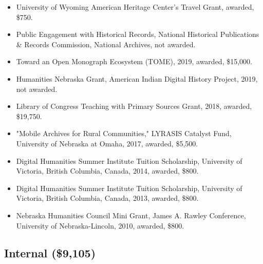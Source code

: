\documentclass[10pt]{article}
\begin{document}
\begin{itemize}
  \item University of Wyoming American Heritage Center's Travel Grant, awarded, \$750.
  \item Public Engagement with Historical Records, National Historical Publications \& Records Commission, National Archives, not awarded.
  \item Toward an Open Monograph Ecosystem (TOME), 2019, awarded, \$15,000.
  \item Humanities Nebraska Grant, American Indian Digital History Project, 2019, not awarded.
  \item Library of Congress Teaching with Primary Sources Grant, 2018, awarded, \$19,750.
  \item "Mobile Archives for Rural Communities," LYRASIS Catalyst Fund, University of Nebraska at Omaha, 2017, awarded, \$5,500.
  \item Digital Humanities Summer Institute Tuition Scholarship, University of Victoria, British Columbia, Canada, 2014, awarded, \$800.
  \item Digital Humanities Summer Institute Tuition Scholarship, University of Victoria, British Columbia, Canada, 2013, awarded, \$800.
  \item Nebraska Humanities Council Mini Grant, James A. Rawley Conference, University of Nebraska-Lincoln, 2010, awarded, \$800.
\end{itemize}

\subsection*{Internal (\$9,105)}
\end{document}
